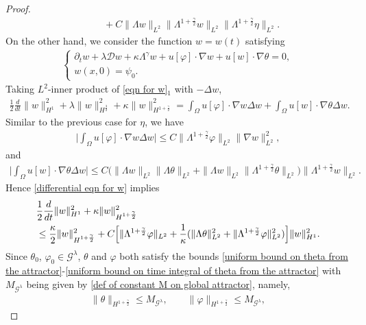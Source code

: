 \documentclass[10pt,a4paper]{amsart}
\newcommand{\Gg}{\mathcal{G}^{\lambda}}
\newcommand{\dt}{\partial_t}
\newcommand{\intox}{\int_{\Omega}}
\begin{document}
\begin{proof}
\begin{align}
&\qquad+C\|\Lambda w\|_{L^2}\|\Lambda^{1+\frac{\gamma}{2}}w\|_{L^2}\|\Lambda^{1+\frac{\gamma}{2}}\eta\|_{L^2}.
\end{align}
On the other hand, we consider the function $w=w(t)$ satisfying
\begin{align}\label{eqn for w}
\left\{ \begin{array}{l}
\dt w+\lambda\mathcal{D}w+\kappa\Lambda^\gamma w+u[\varphi]\cdot\nabla w+u[w]\cdot\nabla\theta=0, \\
w(x,0)=\psi_0.
\end{array}\right.
\end{align}
Taking $L^2$-inner product of \eqref{eqn for w}$_1$ with $-\Delta w$,
\begin{align}\label{differential eqn for w}
\frac{1}{2}\frac{d}{dt}\|w\|^2_{H^1}+\lambda\|w\|^2_{H^{\frac{3}{2}}}+\kappa\|w\|^2_{H^{1+\frac{\gamma}{2}}}=\intox u[\varphi]\cdot\nabla w\Delta w+\intox u[w]\cdot\nabla\theta\Delta w.
\end{align}
Similar to the previous case for $\eta$, we have
\begin{align*}
\Big|\intox u[\varphi]\cdot\nabla w\Delta w\Big|\le C\|\Lambda^{1+\frac{\gamma}{2}}\varphi\|_{L^2}\|\nabla w\|^2_{L^2},
\end{align*}
and 
\begin{align*}
\Big|\intox u[w]\cdot\nabla\theta\Delta w\Big|\le C\Big(\|\Lambda w\|_{L^2}\|\Lambda\theta\|_{L^2}+\|\Lambda w\|_{L^2}\|\Lambda^{1+\frac{\gamma}{2}}\theta\|_{L^2}\Big)\|\Lambda^{1+\frac{\gamma}{2}}w\|_{L^2}.
\end{align*} 
Hence \eqref{differential eqn for w} implies
\begin{align}\label{differential eqn for w step 2}
&\frac{1}{2}\frac{d}{dt}\|w\|^2_{H^1}+\kappa\|w\|^2_{H^{1+\frac{\gamma}{2}}}\notag\\
&\le\frac{\kappa}{2}\|w\|^2_{H^{1+\frac{\gamma}{2}}}+C\Big[\|\Lambda^{1+\frac{\gamma}{2}}\varphi\|_{L^2}+\frac{1}{\kappa}(\|\Lambda\theta\|^2_{L^2}+\|\Lambda^{1+\frac{\gamma}{2}}\varphi\|^2_{L^2})\Big]\|w\|^2_{H^1}.
\end{align}
Since $\theta_0$, $\varphi_0\in\Gg$, $\theta$ and $\varphi$ both satisfy the bounds \eqref{uniform bound on theta from the attractor}-\eqref{uniform bound on time integral of theta from the attractor} with $M_{\Gg}$ being given by \eqref{def of constant M on global attractor}, namely,
\begin{align}\label{uniform bound on theta and varphi}
\|\theta\|_{H^{1+\frac{\gamma}{2}}}\le M_{\Gg},\qquad \|\varphi\|_{H^{1+\frac{\gamma}{2}}}\le M_{\Gg},

\end{align}
\end{proof}
\end{document}
